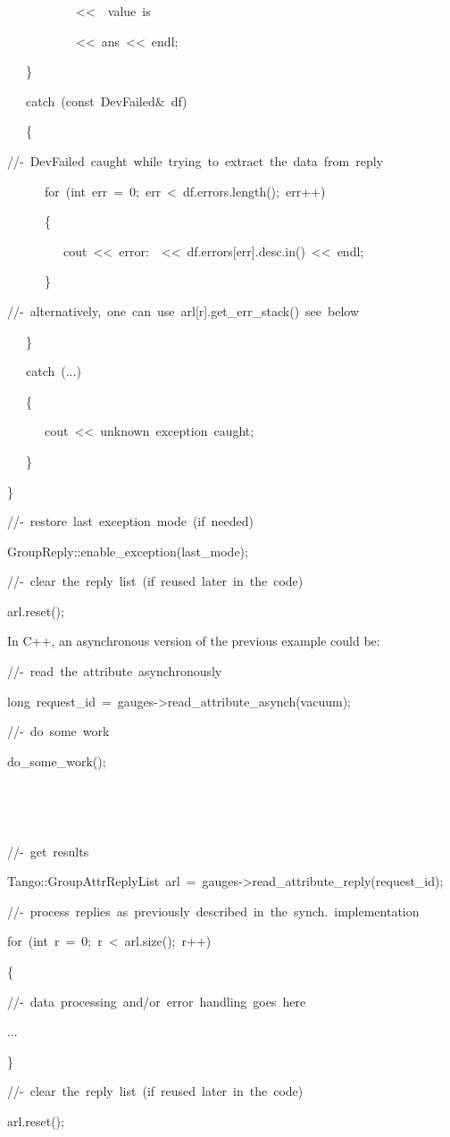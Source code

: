 \begin{lyxcode}
~~~~~~~~~~~<\textcompwordmark{}<~\textquotedbl{}~value~is~\textquotedbl{}

~~~~~~~~~~~<\textcompwordmark{}<~ans~<\textcompwordmark{}<~endl;

~~~\}

~~~catch~(const~DevFailed\&~df)

~~~\{

//-~DevFailed~caught~while~trying~to~extract~the~data~from~reply

~~~~~~for~(int~err~=~0;~err~<~df.errors.length();~err++)

~~~~~~\{

~~~~~~~~~cout~<\textcompwordmark{}<~\textquotedbl{}error:~\textquotedbl{}~<\textcompwordmark{}<~df.errors{[}err{]}.desc.in()~<\textcompwordmark{}<~endl;

~~~~~~\}

//-~alternatively,~one~can~use~arl{[}r{]}.get\_err\_stack()~see~below

~~~\}

~~~catch~(...)

~~~\{

~~~~~~cout~<\textcompwordmark{}<~\textquotedbl{}unknown~exception~caught\textquotedbl{};

~~~\}

\}

//-~restore~last~exception~mode~(if~needed)

GroupReply::enable\_exception(last\_mode);

//-~clear~the~reply~list~(if~reused~later~in~the~code)

arl.reset();
\end{lyxcode}


In C++, an asynchronous version of the previous example could be:


\begin{lyxcode}
//-~read~the~attribute~asynchronously

long~request\_id~=~gauges->read\_attribute\_asynch(\textquotedbl{}vacuum\textquotedbl{});

//-~do~some~work

do\_some\_work();

~

~

//-~get~results

Tango::GroupAttrReplyList~arl~=~gauges->read\_attribute\_reply(request\_id);

//-~process~replies~as~previously~described~in~the~synch.~implementation

for~(int~r~=~0;~r~<~arl.size();~r++)

\{

//-~data~processing~and/or~error~handling~goes~here

...

\}

//-~clear~the~reply~list~(if~reused~later~in~the~code)

arl.reset();
\end{lyxcode}


